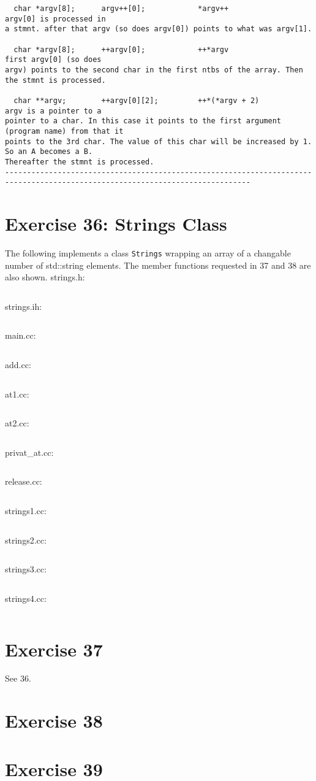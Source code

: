 \documentclass{article}[9pt]
\begin{document}
\begin{verbatim}
  char *argv[8];      argv++[0];            *argv++                     argv[0] is processed in
a stmnt. after that argv (so does argv[0]) points to what was argv[1].

  char *argv[8];      ++argv[0];            ++*argv                     first argv[0] (so does
argv) points to the second char in the first ntbs of the array. Then the stmnt is processed.

  char **argv;        ++argv[0][2];         ++*(*argv + 2)              argv is a pointer to a
pointer to a char. In this case it points to the first argument (program name) from that it
points to the 3rd char. The value of this char will be increased by 1. So an A becomes a B.
Thereafter the stmnt is processed.
------------------------------------------------------------------------------------------------------------------------------
\end{verbatim}
\section*{Exercise 36: Strings Class}
The following implements a class \texttt{Strings} wrapping an array of a changable number of std::string elements.
The member functions requested in 37 and 38 are also shown.
strings.h:
\inputminted[linenos=true, tabsize=4, frame=lines]{text}{../363738/strings/strings.h}
strings.ih:
\inputminted[linenos=true, tabsize=4, frame=lines]{text}{../363738/strings/strings.ih}
main.cc:
\inputminted[linenos=true, tabsize=4, frame=lines]{text}{../363738/main_36.cc}
add.cc:
\inputminted[linenos=true, tabsize=4, frame=lines]{text}{../363738/strings/add.cc}
at1.cc:
\inputminted[linenos=true, tabsize=4, frame=lines]{text}{../363738/strings/at1.cc}
at2.cc:
\inputminted[linenos=true, tabsize=4, frame=lines]{text}{../363738/strings/at2.cc}
privat\_at.cc:
\inputminted[linenos=true, tabsize=4, frame=lines]{text}{../363738/strings/priv_at.cc}
release.cc:
\inputminted[linenos=true, tabsize=4, frame=lines]{text}{../363738/strings/release.cc}
strings1.cc:
\inputminted[linenos=true, tabsize=4, frame=lines]{text}{../363738/strings/strings1.cc}
strings2.cc:
\inputminted[linenos=true, tabsize=4, frame=lines]{text}{../363738/strings/strings2.cc}
strings3.cc:
\inputminted[linenos=true, tabsize=4, frame=lines]{text}{../363738/strings/strings3.cc}
strings4.cc:
\inputminted[linenos=true, tabsize=4, frame=lines]{text}{../363738/strings/strings4.cc}

\section*{Exercise 37}
See 36.


\section*{Exercise 38}

\section*{Exercise 39}
\end{document}
